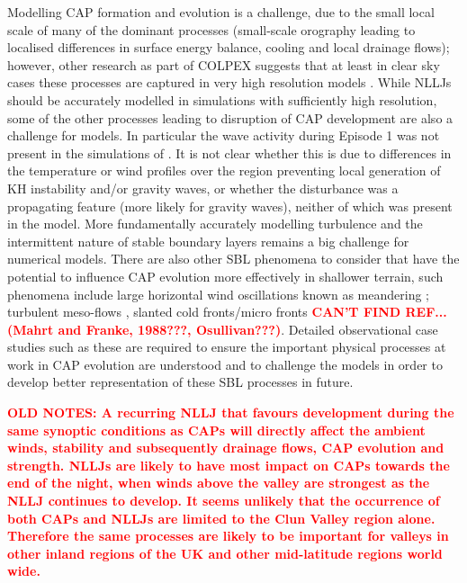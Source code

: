 \documentclass[times]{qjrms4}
\begin{document}
Modelling CAP formation and evolution is a challenge, due to the small local scale of many of the dominant processes (small-scale orography leading to localised differences in surface energy balance, cooling and local drainage flows); however, other research as part of COLPEX suggests that at least in clear sky cases these processes are captured in very high resolution models \citep{vosper2013high,Vosper2013narrow,hughes2015assessment}. While NLLJs should be accurately modelled in simulations with sufficiently high resolution, some of the other processes leading to disruption of CAP development are also a challenge for models. In particular the wave activity during Episode 1 was not present in the simulations of \citep{Vosper2013narrow}. It is not clear whether this is due to differences in the temperature or wind profiles over the region preventing local generation of KH instability and/or gravity waves, or whether the disturbance was a propagating feature (more likely for gravity waves), neither of which was present in the model. More fundamentally accurately modelling turbulence and the intermittent nature of stable boundary layers remains a big challenge for numerical models. There are also other SBL phenomena to consider that have the potential to influence CAP evolution more effectively in shallower terrain, such phenomena include large horizontal wind oscillations known as meandering \citep{orgill1992mesoscale}; turbulent meso-flows \citep{parker1993case}, slanted cold fronts/micro fronts \textcolor{red}{\bf CAN'T FIND REF... (Mahrt and Franke, 1988???, Osullivan???)}. Detailed observational case studies such as these are required to ensure the important physical processes at work in CAP evolution are understood and to challenge the models in order to develop better representation of these SBL processes in future. 

\textcolor{red}{\bf OLD NOTES:  A recurring NLLJ that favours development during the same synoptic conditions as CAPs will directly affect the ambient winds, stability and subsequently drainage flows, CAP evolution and strength. NLLJs are likely to have most impact on CAPs towards the end of the night, when winds above the valley are strongest as the NLLJ continues to develop. It seems unlikely that the occurrence of both CAPs and NLLJs are limited to the Clun Valley region alone. Therefore the same processes are likely to be important for valleys in other inland regions of the UK and other mid-latitude regions world wide.}

\end{document}
